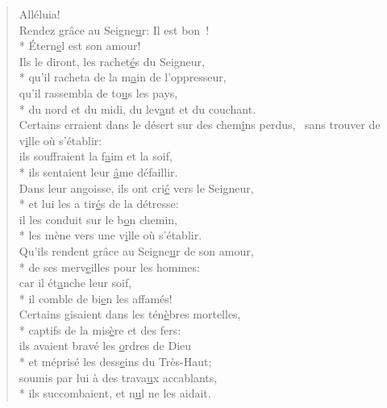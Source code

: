 \begin{verse}
Alléluia! \\

Rendez grâce au Seigne\underline{u}r: Il est bon ! \\*
Étern\underline{e}l est son amour! \\

Ils le diront, les rachet\underline{é}s du Seigneur, \\*
qu’il racheta de la m\underline{a}in de l’oppresseur, \\
qu’il rassembla de to\underline{u}s les pays, \\*
du nord et du midi, du lev\underline{a}nt et du couchant. \\

Certains erraient dans le désert
sur des chem\underline{i}ns perdus,~\psalmstar
sans trouver de v\underline{i}lle où s’établir: \\
ils souffraient la f\underline{a}im et la soif, \\*
ils sentaient leur \underline{â}me défaillir. \\

Dans leur angoisse, ils ont cri\underline{é} vers le Seigneur, \\*
et lui les a tir\underline{é}s de la détresse: \\
il les conduit sur le b\underline{o}n chemin, \\*
les mène vers une v\underline{i}lle où s’établir. \\

Qu’ils rendent grâce au Seigne\underline{u}r de son amour, \\*
de ses merv\underline{e}illes pour les hommes: \\
car il ét\underline{a}nche leur soif, \\*
il comble de bi\underline{e}n les affamés! \\

Certains gisaient dans les tén\underline{è}bres mortelles, \\*
captifs de la mis\underline{è}re et des fers: \\
ils avaient bravé les \underline{o}rdres de Dieu \\*
et méprisé les dess\underline{e}ins du Très-Haut; \\
soumis par lui à des trava\underline{u}x accablants, \\*
ils succombaient, et n\underline{u}l ne les aidait. \\


\end{verse}
